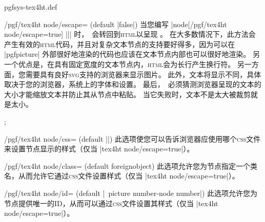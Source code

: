 \begin{filedescription}{pgfsys-tex4ht.def}
\begin{key}{/pgf/tex4ht node/escape= (default |false|)}
    当您编写 |node[/pgf/tex4ht node/escape=true] {||}| 时，\pgfname\ 会转回到\textsc{html}以呈现 。 在大多数情况下，此方法会产生有效的\textsc{html}代码，并且对复杂文本节点的支持要好得多，因为可以在 |{pgfpicture}| 外部很好地渲染的代码也应该在文本节点内部也可以很好地渲染。 另一个优点是，在具有固定宽度的文本节点内，\textsc{html}会为长行产生换行符。 另一方面，您需要具有良好\textsc{svg}支持的浏览器来显示图片。 此外，文本将显示不同，具体取决于您的浏览器，系统上的字体和设置。 最后，\pgfname\ 必须猜测浏览器呈现的文本的大小才能缩放文本并防止其从节点中粘贴。 当它失败时，文本不是太大被裁剪就是太小。
\begin{codeexample}
\tikz {};
\end{codeexample}
    \end{key}

    \begin{key}{/pgf/tex4ht node/css= (default |\string\jobname|)}
        此选项使您可以告诉浏览器应使用哪个\textsc{css}文件来设置节点显示的样式（仅当 |tex4ht node/escape=true|）。
    \end{key}

    \begin{key}{/pgf/tex4ht node/class= (default foreignobject)}
        此选项允许您为节点指定一个类名，从而允许它通过\textsc{css}文件设置样式（仅当 |tex4ht node/escape=true|）。
    \end{key}

    \begin{key}{/pgf/tex4ht node/id= (default |\string\jobname\ picture number-node number|)}
        此选项允许您为节点提供唯一的ID，从而可以通过\textsc{css}文件设置其样式（仅当 |tex4ht node/escape=true|）。
    \end{key}
\end{filedescription}


